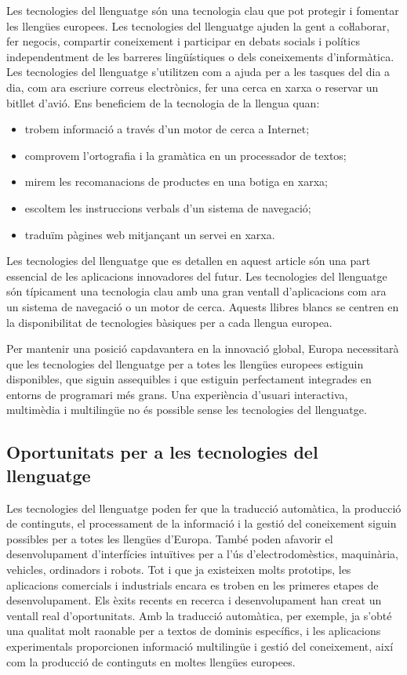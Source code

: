 \documentclass[]{../../metanetpaper}
\begin{document}
\begin{multicols}{2}
Les tecnologies del llenguatge són una tecnologia clau que pot protegir i fomentar les llengües europees. Les tecnologies del llenguatge ajuden la gent a coŀlaborar, fer negocis, compartir coneixement i participar en debats socials i polítics independentment de les barreres lingüístiques o dels coneixements d’informàtica. Les tecnologies del llenguatge s’utilitzen com a ajuda per a les tasques del dia a dia, com ara escriure correus electrònics, fer una cerca en xarxa o reservar un bitllet d’avió. Ens beneficiem de la tecnologia de la llengua quan:   
\begin{itemize}
\item trobem informació a través d’un motor de cerca a Internet;
\item comprovem l’ortografia i la gramàtica en un processador de textos;
\item mirem les recomanacions de productes en una botiga en xarxa;
\item escoltem les instruccions verbals d'un sistema de navegació;
\item traduïm pàgines web mitjançant un servei en xarxa.
\end{itemize}

Les tecnologies del llenguatge que es detallen en aquest article són una part essencial de les aplicacions innovadores del futur. Les tecnologies del llenguatge són típicament una tecnologia clau amb una gran ventall d’aplicacions com ara un sistema de navegació o un motor de cerca. Aquests llibres blancs se centren en la disponibilitat de tecnologies bàsiques per a cada llengua europea.

Per mantenir una posició capdavantera en la innovació global, Europa necessitarà que les tecnologies del llenguatge per a totes les llengües europees estiguin disponibles, que siguin assequibles i que estiguin perfectament integrades en entorns de programari més grans.  Una experiència d’usuari interactiva, multimèdia i multilingüe no és possible sense les tecnologies del llenguatge.

\subsection{Oportunitats per a les tecnologies del llenguatge}

Les tecnologies del llenguatge poden fer que la traducció automàtica, la producció de continguts, el processament de la informació i la gestió del coneixement siguin possibles per a totes les llengües d’Europa. També poden afavorir el desenvolupament d’interfícies intuïtives  per a l'ús d'electrodomèstics, maquinària, vehicles, ordinadors i robots. Tot i que ja existeixen molts prototips, les aplicacions comercials i industrials encara es troben en les primeres etapes de desenvolupament. Els èxits recents en recerca i desenvolupament han creat un ventall real d’oportunitats. Amb la traducció automàtica, per exemple, ja s’obté una qualitat molt raonable per a textos de dominis específics, i les aplicacions experimentals proporcionen informació multilingüe i gestió del coneixement, així com la producció de continguts en moltes llengües europees.


\end{multicols}
\end{document}
